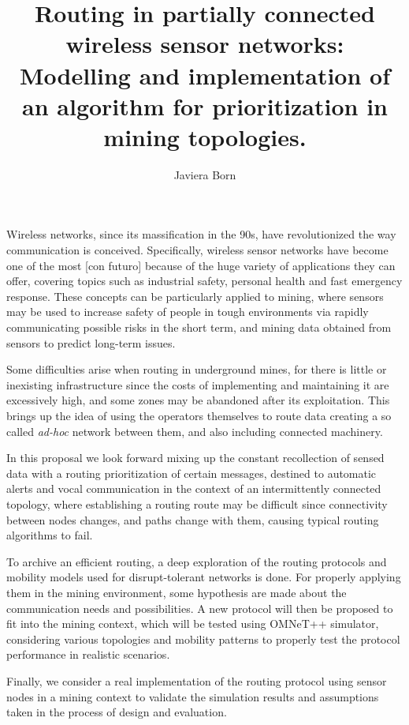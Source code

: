 \documentclass[10pt,preprint,onecolumn]{paper}
\title{Routing in partially connected wireless sensor networks: Modelling and implementation of an algorithm for prioritization in mining topologies.}
\author{Javiera Born}
\begin{document}
\begin{abstract}

\end{abstract}

Wireless networks, since its massification in the 90s, have revolutionized the way communication is conceived. Specifically, wireless sensor networks have become one of the most [con futuro] because of the huge variety of applications they can offer, covering topics such as industrial safety, personal health and fast emergency response. These concepts can be particularly applied to mining, where sensors may be used to increase safety of people in tough environments via rapidly communicating possible risks in the short term, and mining data obtained from sensors to predict long-term issues.

Some difficulties arise when routing in underground mines, for there is little or inexisting infrastructure since the costs of implementing and maintaining it are excessively high, and some zones may be abandoned after its exploitation. This brings up the idea of using the operators themselves to route data creating a so called \emph{ad-hoc} network between them, and also including connected machinery.

In this proposal we look forward mixing up the constant recollection of sensed data with a routing prioritization of certain messages, destined to automatic alerts and vocal communication in the context of an intermittently connected topology, where establishing a routing route may be difficult since connectivity between nodes changes, and paths change with them, causing typical routing algorithms to fail.

To archive an efficient routing, a deep exploration of the routing protocols and mobility models used for disrupt-tolerant networks is done. For properly applying them in the mining environment, some hypothesis are made about the communication needs and possibilities. A new protocol will then be proposed to fit into the mining context, which will be tested using OMNeT++ simulator, considering various topologies and mobility patterns to properly test the protocol performance in realistic scenarios.

Finally, we consider a real implementation of the routing protocol using sensor nodes in a mining context to validate the simulation results and assumptions taken in the process of design and evaluation.

\newpage
\end{document}
